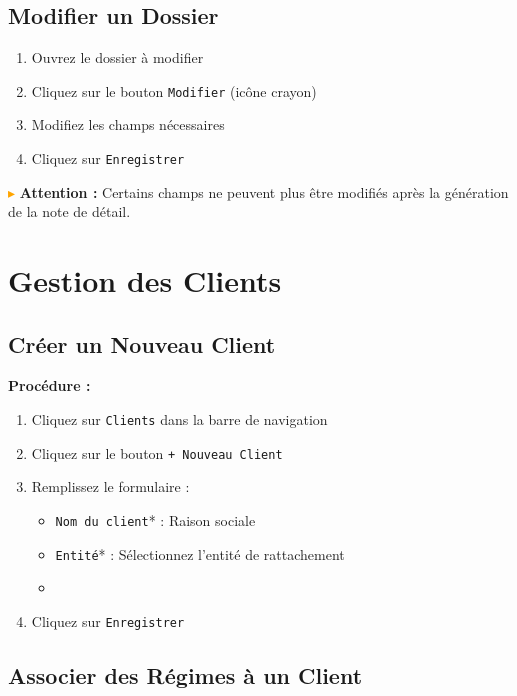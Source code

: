 \documentclass[12pt,a4paper]{report}
\begin{document}
\subsection{Modifier un Dossier}

\begin{enumerate}[leftmargin=*]
    \item Ouvrez le dossier à modifier
    \item Cliquez sur le bouton \texttt{Modifier} (icône crayon)
    \item Modifiez les champs nécessaires
    \item Cliquez sur \texttt{Enregistrer}
\end{enumerate}

\textcolor{orange}{$\blacktriangleright$} \textbf{Attention :} Certains champs ne peuvent plus être modifiés après la génération de la note de détail.

\section{Gestion des Clients}

\subsection{Créer un Nouveau Client}

\textbf{Procédure :}

\begin{enumerate}[leftmargin=*]
    \item Cliquez sur \texttt{Clients} dans la barre de navigation
    \item Cliquez sur le bouton \texttt{+ Nouveau Client}
    \item Remplissez le formulaire :
    \begin{itemize}
        \item \texttt{Nom du client}* : Raison sociale
        \item \texttt{Entité}* : Sélectionnez l'entité de rattachement
        \item [À compléter : autres champs du formulaire]
    \end{itemize}
    \item Cliquez sur \texttt{Enregistrer}
\end{enumerate}

\subsection{Associer des Régimes à un Client}
\end{document}
